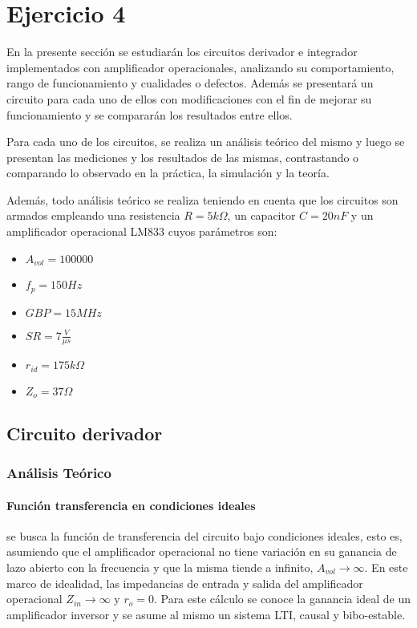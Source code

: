 


\section*{Ejercicio 4}
En la presente secci\'on se estudiar\'an los circuitos derivador e integrador implementados con amplificador operacionales, analizando su comportamiento, rango de funcionamiento y cualidades o defectos. Adem\'as se presentar\'a un circuito para cada uno de ellos con modificaciones con el fin de mejorar su funcionamiento y se comparar\'an los resultados entre ellos.

Para cada uno de los circuitos, se realiza un an\'alisis te\'orico del mismo y luego se presentan las mediciones y los resultados de las mismas, contrastando o comparando lo observado en la pr\'actica, la simulaci\'on y la teor\'ia.

Adem\'as, todo an\'alisis te\'orico se realiza teniendo en cuenta que los circuitos son armados empleando una resistencia $R = 5k \Omega$, un capacitor $C = 20nF$ y un amplificador operacional LM833 cuyos par\'ametros son:
\begin{itemize}
	\item $A_{vol} = 100000$
	\item $f_p = 150Hz$
	\item $GBP = 15MHz$
	\item $SR = 7 \frac{V}{\mu s}$
	\item $r_{id} = 175k \Omega$
	\item $Z_o = 37 \Omega$
\end{itemize}


	\subsection*{Circuito derivador}
 
\subsubsection*{An\'alisis Te\'orico}
	

\paragraph*{Funci\'on transferencia en condiciones ideales}se busca la funci\'on de transferencia del circuito bajo condiciones ideales, esto es, asumiendo que el amplificador operacional no tiene variaci\'on en su ganancia de lazo abierto con la frecuencia y que la misma tiende a infinito, $A_{vol} \to \infty$. En este marco de idealidad, las impedancias de entrada y salida del amplificador operacional $Z_{in} \to \infty$ y $r_o = 0$. Para este c\'alculo se conoce la ganancia ideal de un amplificador inversor y se asume al mismo un sistema LTI, causal y bibo-estable.

